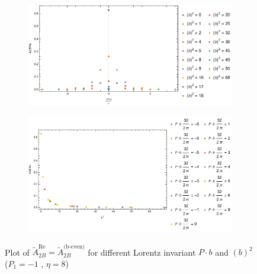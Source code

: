 \documentclass[]{article}
\numberwithin{equation}{section}
\newcommand{\tAmp}{\widetilde{A}}
\newcommand{\tAmp}{\ensuremath{\widetilde{A}^{(+)}}}
\begin{document}
\begin{figure}[h!]
     \centering
     \begin{subfigure}[b]{0.45\textwidth}
         \centering
         \includegraphics[width=\textwidth]{Amp_plots/bP_A2B_b_even_P1_-1_eta_8.pdf}
     \end{subfigure}
     \begin{subfigure}[b]{0.45\textwidth}
         \centering
         \includegraphics[width=\textwidth]{Amp_plots/bsq_A2B_b_even_P1_-1_eta_8.pdf}
     \end{subfigure}
        \caption{Plot of $\tAmp^{\text{Re}}_{2B}=\tAmp^{\text{(b-even)}}_{2B}$ for different Lorentz invariant $P\cdot b$ and $(b)^2$  ($P_{1} = -1$ , $\eta=8$)}
\end{figure}
\end{document}
